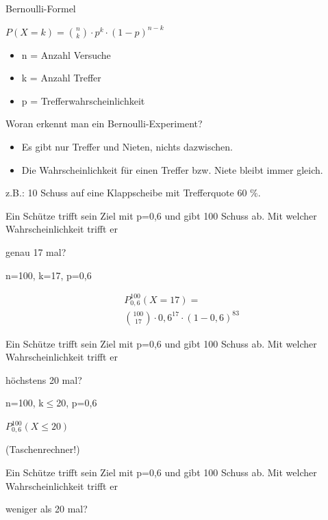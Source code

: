 \begin{frage}Bernoulli-Formel\end{frage}
\begin{antwort}\LARGE
	$P(X=k)=\binom{n}{k} \cdot p^k \cdot (1-p)^{n-k}$
	\large
	\begin{itemize}
		\item n = Anzahl Versuche
		\item k = Anzahl Treffer
		\item p = Trefferwahrscheinlichkeit
	\end{itemize}\end{antwort}
\begin{frage}Woran erkennt man ein Bernoulli-Experiment?\end{frage}
\begin{antwort}\begin{itemize}
		\item Es gibt nur Treffer und Nieten, nichts dazwischen.
		\item Die Wahrscheinlichkeit für einen Treffer bzw. Niete bleibt immer gleich.
	\end{itemize}
	
	z.B.: 10 Schuss auf eine Klappscheibe mit Trefferquote 60 $\%$.\end{antwort}
\begin{frage}\large
	Ein Schütze trifft sein Ziel mit p=0,6 und gibt 100 Schuss ab. Mit welcher Wahrscheinlichkeit trifft er 
	
	\LARGE 
	genau 17 mal?\end{frage}
\begin{antwort}n=100, k=17, p=0,6
	
	\bigskip
	\begin{align*}
	&P^{100}_{0,6}(X=17)= 
	\\&\binom{100}{17} \cdot 0,6^{17}
	\cdot (1-0,6)^{83}
	\end{align*}\end{antwort}
\begin{frage}\large
	Ein Schütze trifft sein Ziel mit p=0,6 und gibt 100 Schuss ab. Mit welcher Wahrscheinlichkeit trifft er 
	
	\LARGE 
	höchstens 20 mal?\end{frage}
\begin{antwort}n=100, k$\leq$20, p=0,6
	
	\bigskip
	$P^{100}_{0,6}(X\leq 20)$
	
	(Taschenrechner!)\end{antwort}
\begin{frage}\large
	Ein Schütze trifft sein Ziel mit p=0,6 und gibt 100 Schuss ab. Mit welcher Wahrscheinlichkeit trifft er 
	
	\LARGE 
	weniger als 20 mal?\end{frage}
